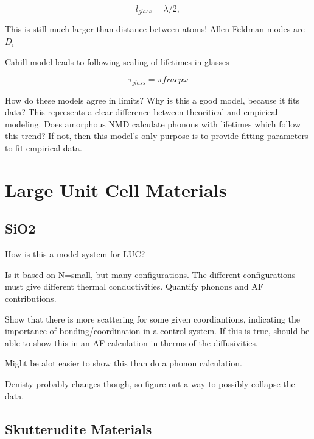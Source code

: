 \documentclass[letterpaper,12pt]{article}
\begin{document}
\begin{equation}\label{EQ:M:l_glass}
l_{glass} =  \lambda/2,
\end{equation}

This is still much larger than distance between atoms! \cite{ascroft} Allen Feldman modes are $D_{i}$ 

Cahill model leads to following scaling of lifetimes in glasses\cite{PhysRevB.46.6131}

\begin{equation}\label{EQ:M:l_glass}
\tau_{glass} =  \pi frac{p}{\omega}
\end{equation}

How do these models agree in limits? Why is this a good model, because it fits data? This represents a clear difference between theoritical and empirical modeling. Does amorphous NMD calculate phonons with lifetimes which follow this trend?  If not, then this model's only purpose is to provide fitting parameters to fit empirical data.



\section{\label{S-validation}Large Unit Cell Materials}

\subsection{\label{S-validation-samples}SiO2}

How is this a model system for LUC?  

Is it based on N=small, but many configurations.  The different configurations must give different thermal conductivities.  Quantify phonons and AF contributions. 

Show that there is more scattering for some given coordiantions, indicating the importance of bonding/coordination in a control system.  If this is true, should be able to show this in an AF calculation in therms of the diffusivities.  

Might be alot easier to show this than do a phonon calculation.

Denisty probably changes though, so figure out a way to possibly collapse the data. 

\subsection{\label{S-validation-samples}Skutterudite Materials}
\end{document}
